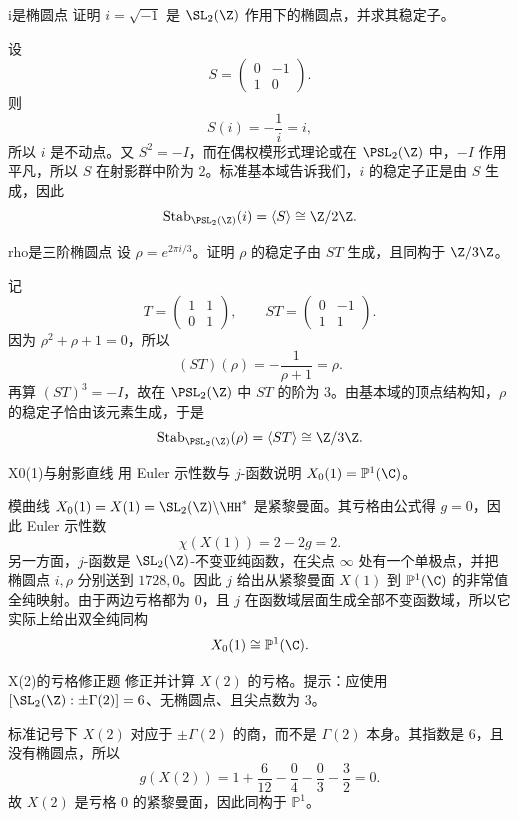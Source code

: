 \begin{problem}{i是椭圆点}
证明 $i=\sqrt{-1}$ 是 $\SL_2(\Z)$ 作用下的椭圆点，并求其稳定子。
\end{problem}
\begin{solution}
设
\[
S=\begin{pmatrix}0&-1\\1&0\end{pmatrix}.
\]
则
\[
S(i)=-\frac1i=i,
\]
所以 $i$ 是不动点。又 $S^2=-I$，而在偶权模形式理论或在 $\PSL_2(\Z)$ 中，$-I$ 作用平凡，所以 $S$ 在射影群中阶为 $2$。标准基本域告诉我们，$i$ 的稳定子正是由 $S$ 生成，因此
\[
\mathrm{Stab}_{\PSL_2(\Z)}(i)=\langle S\rangle\cong \Z/2\Z.
\]
\end{solution}

\begin{problem}{rho是三阶椭圆点}
设 $\rho=e^{2\pi i/3}$。证明 $\rho$ 的稳定子由 $ST$ 生成，且同构于 $\Z/3\Z$。
\end{problem}
\begin{solution}
记
\[
T=\begin{pmatrix}1&1\\0&1\end{pmatrix},
\qquad
ST=\begin{pmatrix}0&-1\\1&1\end{pmatrix}.
\]
因为 $\rho^2+\rho+1=0$，所以
\[
(ST)(\rho)=-\frac1{\rho+1}=\rho.
\]
再算 $(ST)^3=-I$，故在 $\PSL_2(\Z)$ 中 $ST$ 的阶为 $3$。由基本域的顶点结构知，$\rho$ 的稳定子恰由该元素生成，于是
\[
\mathrm{Stab}_{\PSL_2(\Z)}(\rho)=\langle ST\rangle\cong\Z/3\Z.
\]
\end{solution}

\begin{problem}{X0(1)与射影直线}
用 Euler 示性数与 $j$-函数说明 $X_0(1)=\mathbb{P}^1(\C)$。
\end{problem}
\begin{solution}
模曲线 $X_0(1)=X(1)=\SL_2(\Z)\backslash\HH^*$ 是紧黎曼面。其亏格由公式得 $g=0$，因此 Euler 示性数
\[
\chi(X(1))=2-2g=2.
\]
另一方面，$j$-函数是 $\SL_2(\Z)$-不变亚纯函数，在尖点 $\infty$ 处有一个单极点，并把椭圆点 $i,\rho$ 分别送到 $1728,0$。因此 $j$ 给出从紧黎曼面 $X(1)$ 到 $\mathbb{P}^1(\C)$ 的非常值全纯映射。由于两边亏格都为 $0$，且 $j$ 在函数域层面生成全部不变函数域，所以它实际上给出双全纯同构
\[
X_0(1)\cong\mathbb{P}^1(\C).
\]
\end{solution}

\begin{problem}{X(2)的亏格修正题}
修正并计算 $X(2)$ 的亏格。提示：应使用 $[\SL_2(\Z):\pm\Gamma(2)]=6$、无椭圆点、且尖点数为 $3$。
\end{problem}
\begin{solution}
标准记号下 $X(2)$ 对应于 $\pm\Gamma(2)$ 的商，而不是 $\Gamma(2)$ 本身。其指数是 $6$，且没有椭圆点，所以
\[
g(X(2))=1+\frac{6}{12}-\frac{0}{4}-\frac{0}{3}-\frac{3}{2}=0.
\]
故 $X(2)$ 是亏格 $0$ 的紧黎曼面，因此同构于 $\mathbb{P}^1$。
\end{solution}

